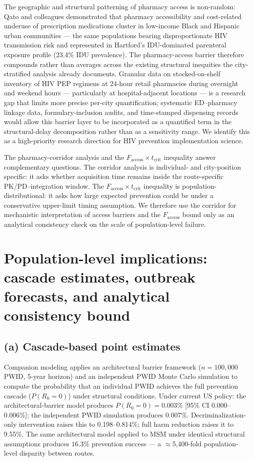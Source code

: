 \documentclass[10pt,letterpaper]{article}
\theoremstyle{definition}
\theoremstyle{remark}
\newcommand{\Faccess}{F_{\text{access}}}
\newcommand{\tcrit}{t_{\text{crit}}}
\begin{document}
The geographic and structural patterning of pharmacy access is non-random: Qato and colleagues demonstrated that pharmacy accessibility and cost-related underuse of prescription medications cluster in low-income Black and Hispanic urban communities\cite{qato2017} --- the same populations bearing disproportionate HIV transmission risk and represented in Hartford's IDU-dominated parenteral exposure profile (23.4\% IDU prevalence). The pharmacy-access barrier therefore compounds rather than averages across the existing structural inequities the city-stratified analysis already documents. Granular data on stocked-on-shelf inventory of HIV PEP regimens at 24-hour retail pharmacies during overnight and weekend hours --- particularly at hospital-adjacent locations --- is a research gap that limits more precise per-city quantification; systematic ED--pharmacy linkage data, formulary-inclusion audits, and time-stamped dispensing records would allow this barrier layer to be incorporated as a quantified term in the structural-delay decomposition rather than as a sensitivity range. We identify this as a high-priority research direction for HIV prevention implementation science.

The pharmacy-corridor analysis and the $\Faccess \times \tcrit$ inequality answer complementary questions. The corridor analysis is individual- and city-position specific: it asks whether acquisition time remains inside the route-specific PK/PD--integration window. The $\Faccess \times \tcrit$ inequality is population-distributional: it asks how large expected prevention could be under a conservative upper-limit timing assumption. We therefore use the corridor for mechanistic interpretation of access barriers and the $\Faccess$ bound only as an analytical consistency check on the scale of population-level failure.

\section*{Population-level implications: cascade estimates, outbreak forecasts, and analytical consistency bound}

\subsection*{(a) Cascade-based point estimates}

Companion modeling\cite{demidont_companion} applies an architectural barrier framework ($n = 100{,}000$ PWID, 5-year horizon) and an independent PWID Monte Carlo simulation to compute the probability that an individual PWID achieves the full prevention cascade ($P(R_{0}=0)$) under structural conditions. Under current US policy: the architectural-barrier model produces $P(R_{0}=0) = 0.003\%$ [95\% CI 0.000--0.006\%]; the independent PWID simulation produces $0.007\%$. Decriminalization-only intervention raises this to 0.198--0.814\%; full harm reduction raises it to 9.55\%. The same architectural model applied to MSM under identical structural assumptions produces $16.3\%$ prevention success --- a $\approx$5{,}400-fold population-level disparity between routes.
\end{document}
